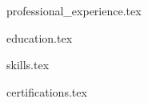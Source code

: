 \documentclass{resume} %
\begin{document}
\vspace{-0.5em}

{professional_experience.tex}

{education.tex}

{skills.tex}

{certifications.tex}

\end{document}
